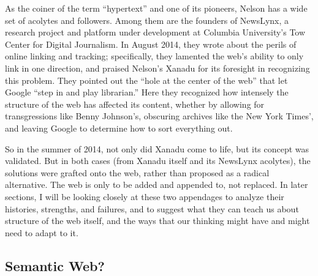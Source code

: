 As the coiner of the term ``hypertext'' and one of its pioneers, Nelson has a wide set of acolytes and followers. Among them are the founders of NewsLynx, a research project and platform under development at Columbia University's Tow Center for Digital Journalism. In August 2014, they wrote about the perils of online linking and tracking; specifically, they lamented the web's ability to only link in one direction, and praised Nelson's Xanadu for its foresight in recognizing this problem. They pointed out the ``hole at the center of the web'' that let Google ``step in and play librarian.'' Here they recognized how intensely the structure of the web has affected its content, whether by allowing for transgressions like Benny Johnson's, obscuring archives like the New York Times', and leaving Google to determine how to sort everything out.

So in the summer of 2014, not only did Xanadu come to life, but its concept was validated. But in both cases (from Xanadu itself and its NewsLynx acolytes), the solutions were grafted onto the web, rather than proposed as a radical alternative. The web is only to be added and appended to, not replaced. In later sections, I will be looking closely at these two appendages to analyze their histories, strengths, and failures, and to suggest what they can teach us about structure of the web itself, and the ways that our thinking might have and might need to adapt to it.

\subsection{Semantic Web?}
